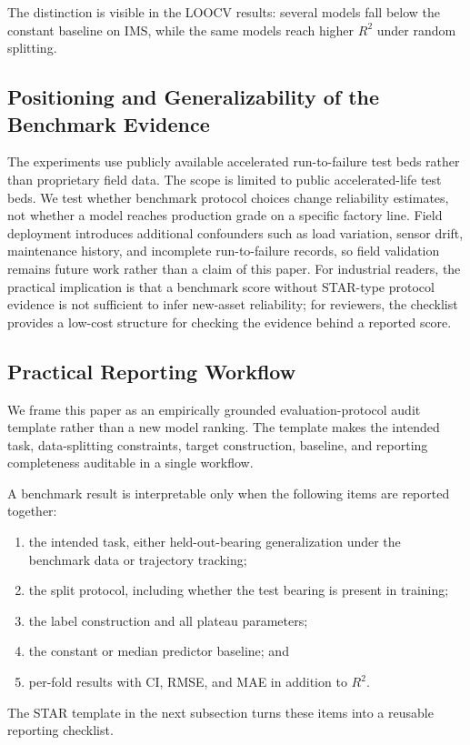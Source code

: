 \documentclass[pdflatex,sn-basic,NameDate]{sn-jnl}
\begin{document}
The distinction is visible in the LOOCV results: several models fall below the constant baseline on IMS, while the same models reach higher $R^2$ under random splitting.


\subsection{Positioning and Generalizability of the Benchmark Evidence}
The experiments use publicly available accelerated run-to-failure test beds rather than proprietary field data. The scope is limited to public accelerated-life test beds. We test whether benchmark protocol choices change reliability estimates, not whether a model reaches production grade on a specific factory line. Field deployment introduces additional confounders such as load variation, sensor drift, maintenance history, and incomplete run-to-failure records, so field validation remains future work rather than a claim of this paper. For industrial readers, the practical implication is that a benchmark score without STAR-type protocol evidence is not sufficient to infer new-asset reliability; for reviewers, the checklist provides a low-cost structure for checking the evidence behind a reported score.

\subsection{Practical Reporting Workflow}
We frame this paper as an empirically grounded evaluation-protocol audit template rather than a new model ranking. The template makes the intended task, data-splitting constraints, target construction, baseline, and reporting completeness auditable in a single workflow.

A benchmark result is interpretable only when the following items are reported together:
\begin{enumerate}
    \item the intended task, either held-out-bearing generalization under the benchmark data or trajectory tracking;
    \item the split protocol, including whether the test bearing is present in training;
    \item the label construction and all plateau parameters;
    \item the constant or median predictor baseline; and
    \item per-fold results with CI, RMSE, and MAE in addition to $R^2$.
\end{enumerate}
The STAR template in the next subsection turns these items into a reusable reporting checklist.
\end{document}
